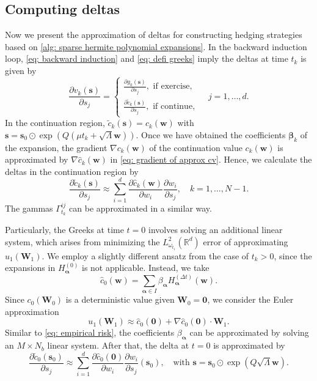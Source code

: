 \documentclass[10pt,a4paper]{amsart}
\numberwithin{equation}{section}
\numberwithin{algorithm}{section}
\theoremstyle{plain}
\theoremstyle{remark}
\newcommand{\R}{\mathbb{R}}
\begin{document}
\subsection{Computing deltas}
Now we present the approximation of deltas for constructing hedging strategies based on \cref{alg: sparse hermite polynomial expansions}. In the backward induction loop, \cref{eq: backward induction} and \cref{eq: defi greeks} imply the deltas at time $t_k$ is given by
\begin{equation*}
    \frac{\partial v_k(\mathbf{s})}{\partial s_j} = \left\{
        \begin{aligned}
            \frac{\partial g_k(\mathbf{s})}{\partial s_j}, \text{ if exercise}, \\
            \frac{\partial {\tilde{c}}_k(\mathbf{s})}{\partial s_j}, \text{ if continue}, 
        \end{aligned}
    \right.\quad j = 1,\dots, d.
\end{equation*}
In the continuation region, $\tilde{c}_k(\mathbf{s}) = c_k(\mathbf{w})$ with $\mathbf{s} = \mathbf{s}_0 \odot \exp(Q(\mu t_k + \sqrt{\Lambda}\mathbf{w}))$.
Once we have obtained the coefficients $\bm{\beta}_k$ of the expansion, the gradient $\nabla c_k(\mathbf{w})$ of the continuation value $c_k(\mathbf{w})$ is approximated by $\nabla \hat{c}_k(\mathbf{w})$ in \cref{eq: gradient of approx cv}. Hence, we calculate the deltas in the continuation region by
\begin{equation*}
    \frac{\partial {\tilde{c}}_k(\mathbf{s})}{\partial s_j} \approx \sum_{i=1}^d \frac{\partial \hat{c}_k(\mathbf{w})}{\partial w_i}\frac{\partial w_i}{\partial s_j}, \quad k = 1,\dots, {N-1}.
\end{equation*}
The gammas $\Gamma_{t_k}^{ij}$ can be approximated in a similar way.

Particularly, the Greeks at time $t=0$ involves solving an additional linear system, which arises from minimizing the $L_{\omega_{t_1}}^2(\R^d)$ error of approximating $u_{1}(\mathbf{W}_1)$. We employ a slightly different ansatz from the case of $t_k>0$, since the expansions in $H_{\bm{\alpha}}^{(0)}$ is not applicable. Instead, we take 
\begin{equation*}
    \hat{c}_0(\mathbf{w}) = \sum_{\bm{\alpha}\in I} \beta_{\bm{\alpha}} H_{\bm{\alpha}}^{(\Delta t)}(\mathbf{w}).
\end{equation*}
Since $c_0(\mathbf{W}_0)$ is a deterministic value given $\mathbf{W}_0 = \mathbf{0}$, we consider the Euler approximation
\begin{equation*}
    u_1(\mathbf{W}_1) \approx \hat{c}_0(\mathbf{0}) + \nabla \hat{c}_0(\mathbf{0}) \cdot \mathbf{W}_1.
\end{equation*}
Similar to \cref{eq: empirical risk}, the coefficients $\beta_{\bm{\alpha}}$ can be approximated by solving an $M\times N_b$ linear system. After that, the delta at $t=0$ is approximated by
\begin{equation*}
    \frac{\partial {\tilde{c}}_0(\mathbf{s}_0)}{\partial s_j} \approx \sum_{i=1}^d \frac{\partial \hat{c}_0(\mathbf{0})}{\partial w_i}\frac{\partial w_i}{\partial s_j}(\mathbf{s}_0),\quad \mbox{with }\mathbf{s} = \mathbf{s}_0 \odot  \exp(Q\sqrt{\Lambda}\mathbf{w}).
\end{equation*}
\end{document}
